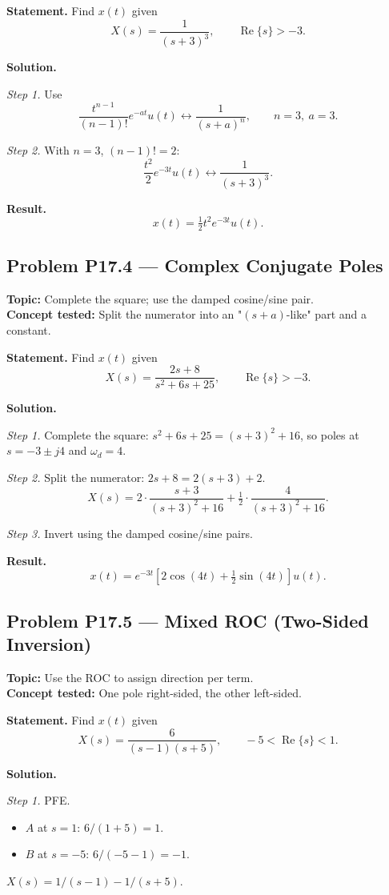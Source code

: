 \documentclass[11pt]{article}
\newcommand{\Real}{\operatorname{Re}}
\begin{document}
\textbf{Statement.} Find $x(t)$ given
\[
X(s) = \frac{1}{(s+3)^{3}},\qquad \Real\{s\}>-3.
\]

\textbf{Solution.}

\textit{Step 1.} Use
\[
\frac{t^{n-1}}{(n-1)!}e^{-at}u(t)\leftrightarrow \frac{1}{(s+a)^{n}},\qquad n=3,\ a=3.
\]

\textit{Step 2.} With $n=3$, $(n-1)!=2$:
\[
\frac{t^{2}}{2}e^{-3t}u(t)\leftrightarrow \frac{1}{(s+3)^{3}}.
\]

\textbf{Result.}
\[
\boxed{\,x(t) = \tfrac{1}{2}t^{2}e^{-3t}u(t).\,}
\]

\subsection{Problem P17.4 --- Complex Conjugate Poles}
\textbf{Topic:} Complete the square; use the damped cosine/sine pair.\\
\textbf{Concept tested:} Split the numerator into an "$(s+a)$-like" part and a constant.

\textbf{Statement.} Find $x(t)$ given
\[
X(s) = \frac{2s+8}{s^{2}+6s+25},\qquad \Real\{s\}>-3.
\]

\textbf{Solution.}

\textit{Step 1.} Complete the square:
$s^{2}+6s+25 = (s+3)^{2}+16$, so poles at $s=-3\pm j4$ and $\omega_{d}=4$.

\textit{Step 2.} Split the numerator:
$2s+8 = 2(s+3)+2$.
\[
X(s) = 2\cdot\frac{s+3}{(s+3)^{2}+16} + \tfrac{1}{2}\cdot\frac{4}{(s+3)^{2}+16}.
\]

\textit{Step 3.} Invert using the damped cosine/sine pairs.

\textbf{Result.}
\[
\boxed{\,x(t) = e^{-3t}\!\left[2\cos(4t)+\tfrac{1}{2}\sin(4t)\right]u(t).\,}
\]

\subsection{Problem P17.5 --- Mixed ROC (Two-Sided Inversion)}
\textbf{Topic:} Use the ROC to assign direction per term.\\
\textbf{Concept tested:} One pole right-sided, the other left-sided.

\textbf{Statement.} Find $x(t)$ given
\[
X(s) = \frac{6}{(s-1)(s+5)},\qquad -5<\Real\{s\}<1.
\]

\textbf{Solution.}

\textit{Step 1.} PFE.
\begin{itemize}
\item $A$ at $s=1$: $6/(1+5) = 1$.
\item $B$ at $s=-5$: $6/(-5-1) = -1$.
\end{itemize}
$X(s) = 1/(s-1) - 1/(s+5)$.
\end{document}
